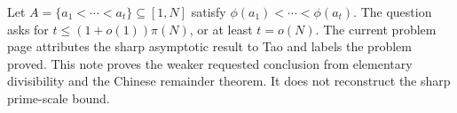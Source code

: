 Let $A=\{a_1<\cdots<a_t\}\subseteq[1,N]$ satisfy $\phi(a_1)<\cdots<\phi(a_t)$. The question asks for $t\le(1+o(1))\pi(N)$, or at least $t=o(N)$. The current problem page attributes the sharp asymptotic result to Tao and labels the problem proved. This note proves the weaker requested conclusion from elementary divisibility and the Chinese remainder theorem. It does not reconstruct the sharp prime-scale bound.
